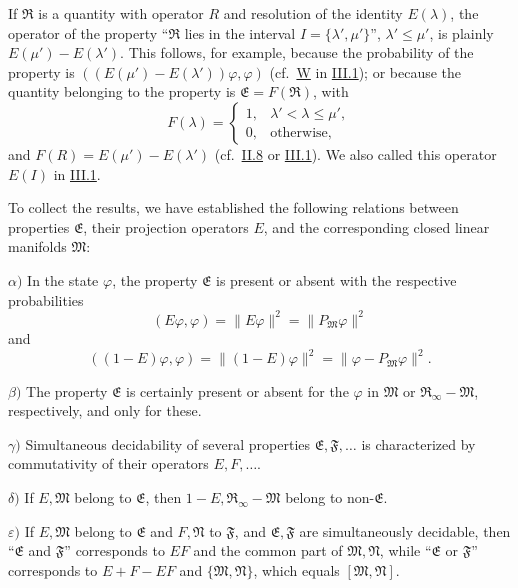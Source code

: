 \documentclass[fontsize=13pt,twoside,openany,headings=normal,parskip=false,bookmarkpackage=false,DIV=calc]{scrbook}
\begin{document}
If $\mathfrak R$ is a quantity with operator $R$ and resolution of the identity $E(\lambda)$, the operator of the property ``$\mathfrak R$ lies in the interval $I=\{\lambda',\mu'\}$'', $\lambda'\le\mu'$, is plainly $E(\mu')-E(\lambda')$. This follows, for example, because the probability of the property is $((E(\mu')-E(\lambda'))\varphi,\varphi)$ (cf.\ \hyperref[post:III.1.W]{W} in \hyperref[sec:III.1]{III.1}); or because the quantity belonging to the property is $\mathfrak E=F(\mathfrak R)$, with
\[
F(\lambda)=\begin{cases}1,&\lambda'<\lambda\le\mu',\\0,&\text{otherwise},\end{cases}
\]
and $F(R)=E(\mu')-E(\lambda')$ (cf.\ \hyperref[sec:II.8]{II.8} or \hyperref[sec:III.1]{III.1}). We also called this operator $E(I)$ in \hyperref[sec:III.1]{III.1}.

To collect the results, we have established the following relations between properties $\mathfrak E$, their projection operators $E$, and the corresponding closed linear manifolds $\mathfrak M$:

\hypertarget{origpage-134}{}%
\leavevmode{}\label{post:III.5.alpha}$\alpha)$ In the state $\varphi$, the property $\mathfrak E$ is present or absent with the respective probabilities
\[
(E\varphi,\varphi)=\|E\varphi\|^2=\|P_{\mathfrak M}\varphi\|^2
\]
and
\[
((1-E)\varphi,\varphi)=\|(1-E)\varphi\|^2=\|\varphi-P_{\mathfrak M}\varphi\|^2.
\]

\leavevmode{}\label{post:III.5.beta}$\beta)$ The property $\mathfrak E$ is certainly present or absent for the $\varphi$ in $\mathfrak M$ or $\mathfrak R_\infty-\mathfrak M$, respectively, and only for these.

\leavevmode{}\label{post:III.5.gamma}$\gamma)$ Simultaneous decidability of several properties $\mathfrak E,\mathfrak F,\ldots$ is characterized by commutativity of their operators $E,F,\ldots$.

\leavevmode{}\label{post:III.5.delta}$\delta)$ If $E,\mathfrak M$ belong to $\mathfrak E$, then $1-E,\mathfrak R_\infty-\mathfrak M$ belong to non-$\mathfrak E$.

\leavevmode{}\label{post:III.5.epsilon}$\varepsilon)$ If $E,\mathfrak M$ belong to $\mathfrak E$ and $F,\mathfrak N$ to $\mathfrak F$, and $\mathfrak E,\mathfrak F$ are simultaneously decidable, then ``$\mathfrak E$ and $\mathfrak F$'' corresponds to $EF$ and the common part of $\mathfrak M,\mathfrak N$, while ``$\mathfrak E$ or $\mathfrak F$'' corresponds to $E+F-EF$ and $\{\mathfrak M,\mathfrak N\}$, which equals $[\mathfrak M,\mathfrak N]$.
\end{document}
